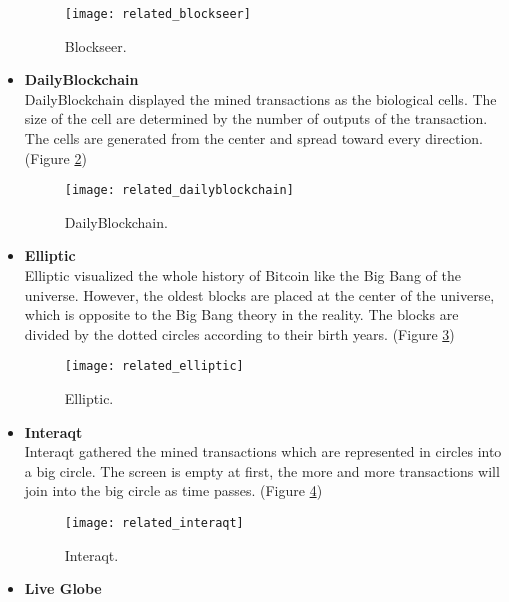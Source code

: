 \begin{itemize}
        \begin{figure}[htb]
            \centering
            \texttt{[image: related\_blockseer]}
            \caption{Blockseer.}
            \label{fig:blockseer}
        \end{figure}
    \vspace*{\fill}
    \clearpage
    \vspace*{\fill}
    \item \textbf{DailyBlockchain} \cite{dailyblockchain} \\
        DailyBlockchain displayed the mined transactions as the biological cells. The size of the cell are determined by the number of outputs of the transaction. The cells are generated from the center and spread toward every direction. (Figure \ref{fig:dailyblockchain})
        \begin{figure}[htb]
            \centering
            \texttt{[image: related\_dailyblockchain]}
            \caption{DailyBlockchain.}
            \label{fig:dailyblockchain}
        \end{figure}
    \item \textbf{Elliptic} \cite{elliptic} \\
        Elliptic visualized the whole history of Bitcoin like the Big Bang of the universe. However, the oldest blocks are placed at the center of the universe, which is opposite to the Big Bang theory in the reality. The blocks are divided by the dotted circles according to their birth years. (Figure \ref{fig:elliptic})
        \begin{figure}[htb]
            \centering
            \texttt{[image: related\_elliptic]}
            \caption{Elliptic.}
            \label{fig:elliptic}
        \end{figure}
    \vspace*{\fill}
    \clearpage
    \item \textbf{Interaqt} \cite{interaqt} \\
        Interaqt gathered the mined transactions which are represented in circles into a big circle. The screen is empty at first, the more and more transactions will join into the big circle as time passes. (Figure \ref{fig:interaqt})
        \begin{figure}[htb]
            \centering
            \texttt{[image: related\_interaqt]}
            \caption{Interaqt.}
            \label{fig:interaqt}
        \end{figure}
    \item \textbf{Live Globe} \cite{liveglobe} \\

\end{itemize}
